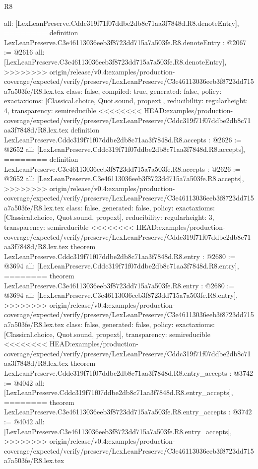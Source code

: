 \begin{lexlean}{R8}
\begin{coremodule}
{{{{{{{{{{{{{{{{{{{{{{{{{{{{{{{{{{{{  all: [LexLeanPreserve.Cddc319f71f07ddbe2db8c71aa3f7848d.R8.denoteEntry],
========
definition LexLeanPreserve.C3e46113036eeb3f8723dd715a7a503fe.R8.denoteEntry : @2067 := @2616 {
  all: [LexLeanPreserve.C3e46113036eeb3f8723dd715a7a503fe.R8.denoteEntry],
>>>>>>>> origin/release/v0.4:examples/production-coverage/expected/verify/preserve/LexLeanPreserve/C3e46113036eeb3f8723dd715a7a503fe/R8.lex.tex
  class: false,
  compiled: true,
  generated: false,
  policy: exact{axioms: [Classical.choice, Quot.sound, propext]},
  reducibility: regular{height: 4},
  transparency: semireducible
}
<<<<<<<< HEAD:examples/production-coverage/expected/verify/preserve/LexLeanPreserve/Cddc319f71f07ddbe2db8c71aa3f7848d/R8.lex.tex
definition LexLeanPreserve.Cddc319f71f07ddbe2db8c71aa3f7848d.R8.accepts : @2626 := @2652 {
  all: [LexLeanPreserve.Cddc319f71f07ddbe2db8c71aa3f7848d.R8.accepts],
========
definition LexLeanPreserve.C3e46113036eeb3f8723dd715a7a503fe.R8.accepts : @2626 := @2652 {
  all: [LexLeanPreserve.C3e46113036eeb3f8723dd715a7a503fe.R8.accepts],
>>>>>>>> origin/release/v0.4:examples/production-coverage/expected/verify/preserve/LexLeanPreserve/C3e46113036eeb3f8723dd715a7a503fe/R8.lex.tex
  class: false,
  generated: false,
  policy: exact{axioms: [Classical.choice, Quot.sound, propext]},
  reducibility: regular{height: 3},
  transparency: semireducible
}
<<<<<<<< HEAD:examples/production-coverage/expected/verify/preserve/LexLeanPreserve/Cddc319f71f07ddbe2db8c71aa3f7848d/R8.lex.tex
theorem LexLeanPreserve.Cddc319f71f07ddbe2db8c71aa3f7848d.R8.entry : @2680 := @3694 {
  all: [LexLeanPreserve.Cddc319f71f07ddbe2db8c71aa3f7848d.R8.entry],
========
theorem LexLeanPreserve.C3e46113036eeb3f8723dd715a7a503fe.R8.entry : @2680 := @3694 {
  all: [LexLeanPreserve.C3e46113036eeb3f8723dd715a7a503fe.R8.entry],
>>>>>>>> origin/release/v0.4:examples/production-coverage/expected/verify/preserve/LexLeanPreserve/C3e46113036eeb3f8723dd715a7a503fe/R8.lex.tex
  class: false,
  generated: false,
  policy: exact{axioms: [Classical.choice, Quot.sound, propext]},
  transparency: semireducible
}
<<<<<<<< HEAD:examples/production-coverage/expected/verify/preserve/LexLeanPreserve/Cddc319f71f07ddbe2db8c71aa3f7848d/R8.lex.tex
theorem LexLeanPreserve.Cddc319f71f07ddbe2db8c71aa3f7848d.R8.entry_accepts : @3742 := @4042 {
  all: [LexLeanPreserve.Cddc319f71f07ddbe2db8c71aa3f7848d.R8.entry_accepts],
========
theorem LexLeanPreserve.C3e46113036eeb3f8723dd715a7a503fe.R8.entry_accepts : @3742 := @4042 {
  all: [LexLeanPreserve.C3e46113036eeb3f8723dd715a7a503fe.R8.entry_accepts],
>>>>>>>> origin/release/v0.4:examples/production-coverage/expected/verify/preserve/LexLeanPreserve/C3e46113036eeb3f8723dd715a7a503fe/R8.lex.tex
}}}}}}}}}}}}}}}}}}}}}}}}}}}}}}}}}}}}}}}}
\end{coremodule}
\end{lexlean}
